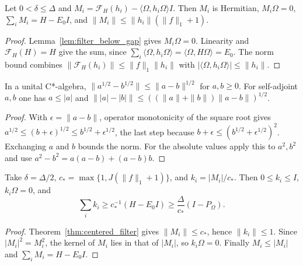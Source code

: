 \begin{theorem}
    \label{thm:centered_filter}
    \leanok
    Let $0<\delta\le\Delta$ and
    $M_i=\mathcal F_H(h_i)-\langle\Omega,h_i\Omega\rangle I$. Then $M_i$ is
    Hermitian, $M_i\Omega=0$, $\sum_iM_i=H-E_0I$, and
    $\|M_i\|\le\|h_i\|(\|f\|_1+1)$.
\end{theorem}
\begin{proof}\leanok
    Lemma~\ref{lem:filter_below_gap} gives $M_i\Omega=0$. Linearity and
    $\mathcal F_H(H)=H$ give the sum, since
    $\sum_i\langle\Omega,h_i\Omega\rangle=\langle\Omega,H\Omega\rangle=E_0$.
    The norm bound combines $\|\mathcal F_H(h_i)\|\le\|f\|_1\|h_i\|$ with
    $|\langle\Omega,h_i\Omega\rangle|\le\|h_i\|$.
\end{proof}

\begin{lemma}
    \label{lem:sqrt_holder}
    \leanok
    In a unital C*-algebra, $\|a^{1/2}-b^{1/2}\|\le\|a-b\|^{1/2}$ for
    $a,b\ge0$. For self-adjoint $a,b$ one has $a\le|a|$ and
    $\||a|-|b|\|\le((\|a\|+\|b\|)\|a-b\|)^{1/2}$.
\end{lemma}
\begin{proof}\leanok
    With $\epsilon=\|a-b\|$, operator monotonicity of the square root gives
    $a^{1/2}\le(b+\epsilon)^{1/2}\le b^{1/2}+\epsilon^{1/2}$, the last step
    because $b+\epsilon\le(b^{1/2}+\epsilon^{1/2})^2$. Exchanging $a$ and $b$
    bounds the norm. For the absolute values apply this to $a^2,b^2$ and use
    $a^2-b^2=a(a-b)+(a-b)b$.
\end{proof}

\begin{theorem}
    \label{thm:positive_replacement}
    \leanok
    Take $\delta=\Delta/2$, $c_*=\max\{1,J(\|f\|_1+1)\}$, and
    $k_i=|M_i|/c_*$. Then $0\le k_i\le I$, $k_i\Omega=0$, and
    \[
        \sum_ik_i\ge c_*^{-1}(H-E_0I)\ge\frac{\Delta}{c_*}(I-P_\Omega).
    \]
\end{theorem}
\begin{proof}\leanok
    Theorem~\ref{thm:centered_filter} gives $\|M_i\|\le c_*$, hence
    $\|k_i\|\le1$. Since $|M_i|^2=M_i^2$, the kernel of $M_i$ lies in that of
    $|M_i|$, so $k_i\Omega=0$. Finally $M_i\le|M_i|$ and $\sum_iM_i=H-E_0I$.
\end{proof}

